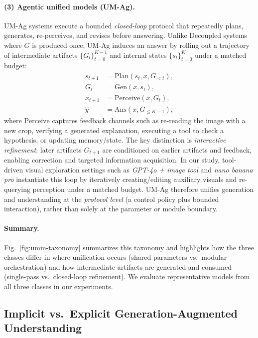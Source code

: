 \documentclass{article}
\theoremstyle{plain}
\theoremstyle{definition}
\theoremstyle{remark}
\begin{document}
\paragraph{(3) Agentic unified models (UM-Ag).}
UM-Ag systems execute a bounded \emph{closed-loop} protocol that repeatedly plans, generates, re-perceives, and revises before answering.
Unlike Decoupled systems where $G$ is produced once, UM-Ag induces an answer by rolling out a trajectory of intermediate artifacts
$\{G_t\}_{t=0}^{K-1}$ and internal states $\{s_t\}_{t=0}^{K}$ under a matched budget:
\begin{equation}
\begin{aligned}
s_{t+1} &= \mathrm{Plan}(s_t, x, G_{<t}), \\
G_t &= \mathrm{Gen}(x, s_{t}), \\
x_{t+1} &= \mathrm{Perceive}(x, G_t) ,\\
\hat{y} &= \mathrm{Ans}(x, G_{\le K-1}),
\end{aligned}
\label{eq:umag_loop}
\end{equation}
where $\mathrm{Perceive}$ captures feedback channels such as re-reading the image with a new crop, verifying a generated explanation,
executing a tool to check a hypothesis, or updating memory/state. The key distinction is \emph{interactive refinement}:
later artifacts $G_{t+1}$ are conditioned on earlier artifacts and feedback, enabling correction and targeted information acquisition.
In our study, tool-driven visual exploration settings such as \emph{GPT-4o + image tool} and \emph{nano banana pro} instantiate this loop by
iteratively creating/editing auxiliary visuals and re-querying perception under a matched budget.
UM-Ag therefore unifies generation and understanding at the \emph{protocol level} (a control policy plus bounded interaction),
rather than solely at the parameter or module boundary.

\paragraph{Summary.}
Fig.~\ref{fig:umm-taxonomy} summarizes this taxonomy and highlights how the three classes differ in where unification occurs (shared parameters vs.\ modular orchestration) and how intermediate artifacts are generated and consumed (single-pass vs.\ closed-loop refinement). We evaluate representative models from all three classes in our experiments.


\subsection{Implicit vs.\ Explicit Generation-Augmented Understanding}
\label{sec:implicit_explicit}
\end{document}
